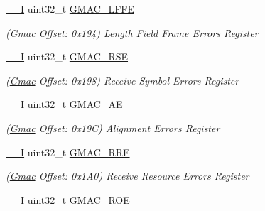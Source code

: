 \begin{DoxyCompactItemize}
\mbox{\label{structGmac_aca0c5aa1b0c338ad1ae26e2fda0706fc}} 
\mbox{\hyperlink{core__cm7_8h_af63697ed9952cc71e1225efe205f6cd3}{\+\_\+\+\_\+I}} uint32\+\_\+t \mbox{\hyperlink{structGmac_aca0c5aa1b0c338ad1ae26e2fda0706fc}{G\+M\+A\+C\+\_\+\+L\+F\+FE}}
\begin{DoxyCompactList}\small\item\em (\mbox{\hyperlink{structGmac}{Gmac}} Offset\+: 0x194) Length Field Frame Errors Register \end{DoxyCompactList}\item 
\mbox{\label{structGmac_a87a49099761521072667fe366d84ffac}} 
\mbox{\hyperlink{core__cm7_8h_af63697ed9952cc71e1225efe205f6cd3}{\+\_\+\+\_\+I}} uint32\+\_\+t \mbox{\hyperlink{structGmac_a87a49099761521072667fe366d84ffac}{G\+M\+A\+C\+\_\+\+R\+SE}}
\begin{DoxyCompactList}\small\item\em (\mbox{\hyperlink{structGmac}{Gmac}} Offset\+: 0x198) Receive Symbol Errors Register \end{DoxyCompactList}\item 
\mbox{\label{structGmac_ae2b50d7860d4ca08d9ac1e7fb991afc8}} 
\mbox{\hyperlink{core__cm7_8h_af63697ed9952cc71e1225efe205f6cd3}{\+\_\+\+\_\+I}} uint32\+\_\+t \mbox{\hyperlink{structGmac_ae2b50d7860d4ca08d9ac1e7fb991afc8}{G\+M\+A\+C\+\_\+\+AE}}
\begin{DoxyCompactList}\small\item\em (\mbox{\hyperlink{structGmac}{Gmac}} Offset\+: 0x19C) Alignment Errors Register \end{DoxyCompactList}\item 
\mbox{\label{structGmac_a6e43f3fdcb236e0ad87d3beba40cdf17}} 
\mbox{\hyperlink{core__cm7_8h_af63697ed9952cc71e1225efe205f6cd3}{\+\_\+\+\_\+I}} uint32\+\_\+t \mbox{\hyperlink{structGmac_a6e43f3fdcb236e0ad87d3beba40cdf17}{G\+M\+A\+C\+\_\+\+R\+RE}}
\begin{DoxyCompactList}\small\item\em (\mbox{\hyperlink{structGmac}{Gmac}} Offset\+: 0x1\+A0) Receive Resource Errors Register \end{DoxyCompactList}\item 
\mbox{\label{structGmac_aa51ebfe01c0e1ea7516689c71ce47e97}} 
\mbox{\hyperlink{core__cm7_8h_af63697ed9952cc71e1225efe205f6cd3}{\+\_\+\+\_\+I}} uint32\+\_\+t \mbox{\hyperlink{structGmac_aa51ebfe01c0e1ea7516689c71ce47e97}{G\+M\+A\+C\+\_\+\+R\+OE}}

\end{DoxyCompactItemize}
